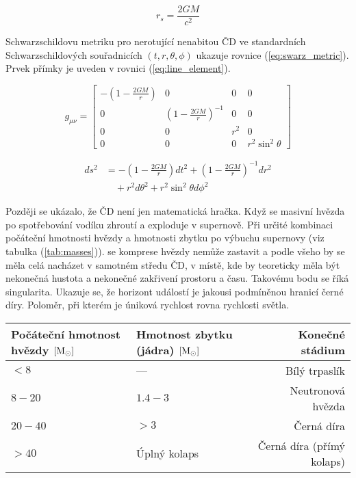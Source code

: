 \documentclass[
	a4paper, %
	10pt, %
	unnumberedsections, %
	twoside, %
]{LTJournalArticle}
\begin{document}
\begin{equation*}
	r_s = \frac{2GM}{c^2}
\end{equation*}

Schwarzschildovu metriku pro nerotující nenabitou ČD ve standardních Schwarzschildových souřadnicích $(t, r, \theta, \phi)$ ukazuje rovnice (\ref{eq:swarz_metric}). Prvek přímky je uveden v rovnici (\ref{eq:line_element}).

\begin{equation}
g_{\mu\nu} =
\begin{bmatrix}
	-\left(1 - \frac{2GM}{r}\right) & 0 & 0 & 0 \\
	0 & \left(1 - \frac{2GM}{r}\right)^{-1} & 0 & 0 \\
	0 & 0 & r^2 & 0 \\
	0 & 0 & 0 & r^2 \sin^2 \theta
	\label{eq:swarz_metric}
\end{bmatrix}
\end{equation}

\begin{equation}
	\begin{split}
		ds^2 &= -\left( 1 - \frac{2GM}{r} \right) dt^2 
		+ \left( 1 - \frac{2GM}{r} \right)^{-1} dr^2 \\
		&\quad + r^2 d\theta^2 
		+ r^2 \sin^2 \theta d\phi^2
	\end{split}
	\label{eq:line_element}
\end{equation}

Později se ukázalo, že ČD není jen matematická hračka. Když se masivní hvězda po spotřebování vodíku zhroutí a exploduje v supernově. Při určité kombinaci počáteční hmotnosti hvězdy a hmotnosti zbytku po výbuchu supernovy (viz tabulka (\ref{tab:masses})). se komprese hvězdy nemůže zastavit a podle všeho by se měla celá nacházet v samotném středu ČD, v místě, kde by teoreticky měla být nekonečná hustota a nekonečné zakřivení prostoru a času. Takovému bodu se říká singularita. Ukazuje se, že horizont událostí je jakousi podmíněnou hranicí černé díry. Poloměr, při kterém je úniková rychlost rovna rychlosti světla.

\begin{table*} %
    \caption{Vývoj hvězd podle jejich hmotnosti}
    \centering
    \begin{tabular}{l l r}
        \toprule
        Počáteční hmotnost hvězdy $[\textup{M}_\odot]$ & Hmotnost zbytku (jádra) $[\textup{M}_\odot]$ & Konečné stádium \\
        \midrule
        $< 8$  & ---  & Bílý trpaslík \\
        $8 - 20$  & $1.4 - 3$ & Neutronová hvězda \\
        $20 - 40$  & $> 3$ & Černá díra \\
        $> 40$ & Úplný kolaps & Černá díra (přímý kolaps) \\
        \bottomrule
    \end{tabular}
    \label{tab:masses}
\end{table*}
\end{document}

